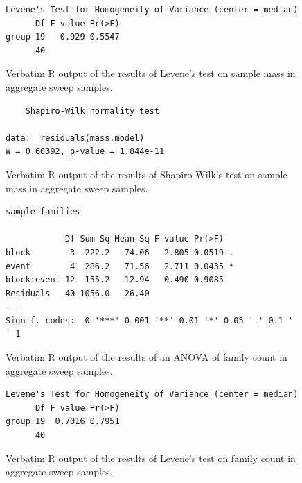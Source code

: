 \documentclass[10pt,letterpaper,twocolumn]{article}
\begin{document}
\begin{figure}[h]
	\lstset{numbers=left}
	\lstset{xleftmargin=5mm,framexleftmargin=5mm}
	\begin{lstlisting}
Levene's Test for Homogeneity of Variance (center = median)
      Df F value Pr(>F)
group 19   0.929 0.5547
      40               

	\end{lstlisting}
	\caption{Verbatim R output of the results of Levene's test on sample mass in aggregate sweep samples.}
	\label{fig:bulk_sweep_mass_levene}
	\smallskip
	\nointerlineskip
	\hrulefill
\end{figure}

\begin{figure}[h]
	\lstset{numbers=left}
	\lstset{xleftmargin=5mm,framexleftmargin=5mm}
	\begin{lstlisting}
	Shapiro-Wilk normality test

data:  residuals(mass.model)
W = 0.60392, p-value = 1.844e-11
	\end{lstlisting}
	\caption{Verbatim R output of the results of Shapiro-Wilk's test on sample mass in aggregate sweep samples.}
	\label{fig:bulk_sweep_mass_shapiro}
	\smallskip
	\nointerlineskip
	\hrulefill
\end{figure}

\begin{figure}[h]
	\lstset{numbers=left}
	\lstset{xleftmargin=5mm,framexleftmargin=5mm}
	\begin{lstlisting}
sample families 

            Df Sum Sq Mean Sq F value Pr(>F)  
block        3  222.2   74.06   2.805 0.0519 .
event        4  286.2   71.56   2.711 0.0435 *
block:event 12  155.2   12.94   0.490 0.9085  
Residuals   40 1056.0   26.40                 
---
Signif. codes:  0 '***' 0.001 '**' 0.01 '*' 0.05 '.' 0.1 ' ' 1
	\end{lstlisting}
	\caption{Verbatim R output of the results of an ANOVA of family count in aggregate sweep samples.}
	\label{fig:bulk_sweep_family_anova}
	\smallskip
	\nointerlineskip
	\hrulefill
\end{figure}

\begin{figure}[h]
	\lstset{numbers=left}
	\lstset{xleftmargin=5mm,framexleftmargin=5mm}
	\begin{lstlisting}
Levene's Test for Homogeneity of Variance (center = median)
      Df F value Pr(>F)
group 19  0.7016 0.7951
      40               
	\end{lstlisting}
	\caption{Verbatim R output of the results of Levene's test on family count in aggregate sweep samples.}
	\label{fig:bulk_sweep_family_levene}
	\smallskip
	\nointerlineskip
	\hrulefill
\end{figure}
\end{document}
